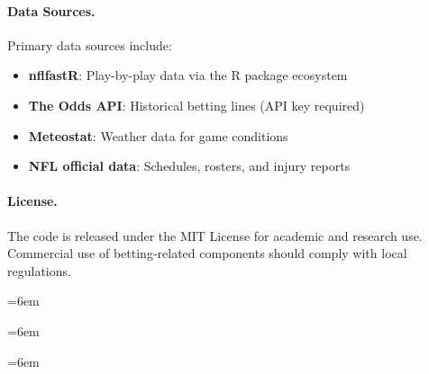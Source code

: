 \documentclass[12pt]{report}  %
\numberwithin{equation}{section}
\theoremstyle{plain}
\theoremstyle{definition}
\theoremstyle{remark}
\providecommand{\mainmatter}{\cleardoublepage\pagenumbering{arabic}}
\begin{document}
\paragraph{Data Sources.}
Primary data sources include:
\begin{itemize}
  \item \textbf{nflfastR}: Play-by-play data via the R package ecosystem
  \item \textbf{The Odds API}: Historical betting lines (API key required)
  \item \textbf{Meteostat}: Weather data for game conditions
  \item \textbf{NFL official data}: Schedules, rosters, and injury reports
\end{itemize}

\paragraph{License.}
The code is released under the MIT License for academic and research use. Commercial use of betting-related components should comply with local regulations.

\cleardoublepage
{}
\begingroup\sloppy\RaggedRight\emergencystretch=6em
\tableofcontents
\endgroup

\cleardoublepage
{}
{}
\begingroup\sloppy\RaggedRight\emergencystretch=6em
\listoffigures
\endgroup

\cleardoublepage
{}
{}
\begingroup\sloppy\RaggedRight\emergencystretch=6em
\listoftables
\endgroup

\cleardoublepage
{}
{}

\hypersetup{pageanchor=true}
\mainmatter
\end{document}
